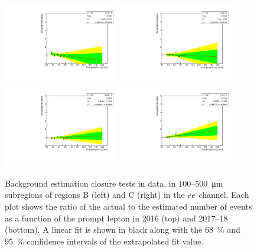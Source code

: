 \begin{figure}
\centering
\includegraphics[width=0.45\textwidth]{figures/bg/ee_data_2016_displacedLeading_ratiosVsPromptD0.pdf}
\includegraphics[width=0.45\textwidth]{figures/bg/ee_data_2016_displacedSubleading_ratiosVsPromptD0.pdf}
\includegraphics[width=0.45\textwidth]{figures/bg/ee_data_2017_2018_displacedLeading_ratiosVsPromptD0.pdf}
\includegraphics[width=0.45\textwidth]{figures/bg/ee_data_2017_2018_displacedSubleading_ratiosVsPromptD0.pdf}
\caption{Background estimation closure tests in data, in 100--\SI{500}{\um} subregions of regions B (left) and C (right) in the $ee$ channel. Each plot shows the ratio of the actual to the estimated number of events as a function of the prompt lepton \ad in 2016 (top) and 2017--18 (bottom). A linear fit is shown in black along with the \SI{68}{\percent} and \SI{95}{\percent} confidence intervals of the extrapolated fit value.}
\label{100to500um_fits_ee}
\end{figure}


